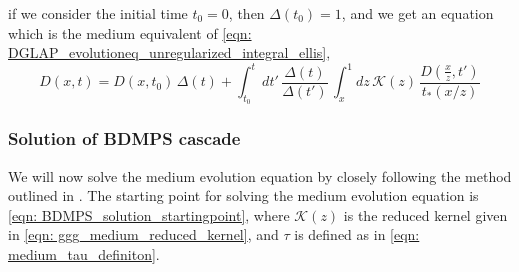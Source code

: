 \documentclass[main.tex]{subfiles}
\begin{document}
if we consider the initial time \(t_0 = 0\), then \(\Delta(t_0) = 1\), and we get an equation which is the medium equivalent of \autoref{eqn: DGLAP_evolutioneq_unregularized_integral_ellis}, 
\begin{equation}
    D(x,t) = D(x,t_0)\, \Delta(t) + \int_{t_0}^t dt' \, \frac{\Delta(t)}{\Delta(t')} \, \int_x^1 dz\, \mathcal{K}(z)\, \frac{D\left(\frac{x}{z}, t'\right)}{t_*(x/z)} 
\end{equation}

\subsubsection{Solution of BDMPS cascade }
We will now solve the medium evolution equation by closely following the method outlined in \cite{Energy_flow_medium_cascade_2016}.
The starting point for solving the medium evolution equation is \autoref{eqn: BDMPS_solution_startingpoint}, where \(\mathcal{K}(z)\) is the reduced kernel given in \autoref{eqn: ggg_medium_reduced_kernel}, and \(\tau \) is defined as in \autoref{eqn: medium_tau_definiton}.
\end{document}
